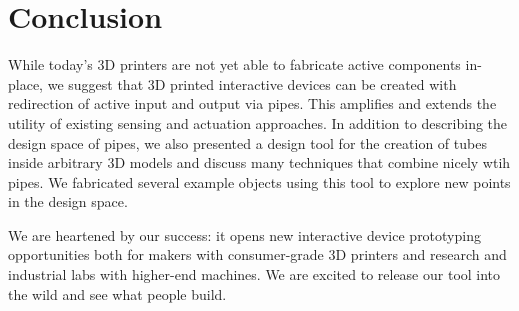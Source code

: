 \section{Conclusion}

While today's 3D printers are not yet able to fabricate active components in-place, we suggest that 3D printed interactive devices can be created with redirection of active input and output via pipes.  This amplifies and extends the utility of existing sensing and actuation approaches.  In addition to describing the design space of pipes, we also presented a design tool for the creation of tubes inside arbitrary 3D models and discuss many techniques that combine nicely wtih pipes.  We fabricated several example objects using this tool to explore new points in the design space.

We are heartened by our success: it opens new interactive device prototyping opportunities both for makers with consumer-grade 3D printers and research and industrial labs with higher-end machines.  We are excited to release our tool into the wild and see what people build.